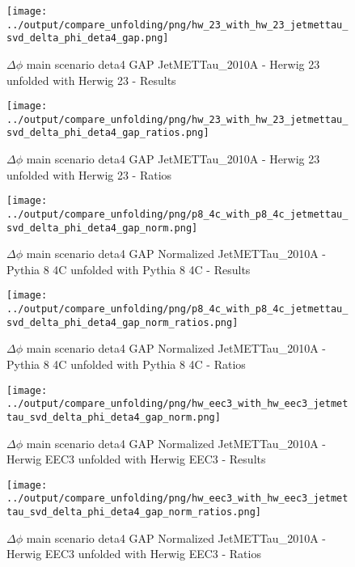 \documentclass[11pt]{book}
\begin{document}
\begin{figure}[ht]
\centering
\texttt{[image: ../output/compare\_unfolding/png/hw\_23\_with\_hw\_23\_jetmettau\_svd\_delta\_phi\_deta4\_gap.png]}
\caption{$\Delta\phi$ main scenario deta4 GAP JetMETTau\_2010A - Herwig 23 unfolded with Herwig 23 - Results}
\label{hw_23_hw_23_jetmettau_svd_delta_phi_deta4_gap_a}
\end{figure}

\begin{figure}[ht]
\centering
\texttt{[image: ../output/compare\_unfolding/png/hw\_23\_with\_hw\_23\_jetmettau\_svd\_delta\_phi\_deta4\_gap\_ratios.png]}
\caption{$\Delta\phi$ main scenario deta4 GAP JetMETTau\_2010A - Herwig 23 unfolded with Herwig 23 - Ratios}
\label{hw_23_hw_23_jetmettau_svd_delta_phi_deta4_gap_b}
\end{figure}



\begin{figure}[ht]
\centering
\texttt{[image: ../output/compare\_unfolding/png/p8\_4c\_with\_p8\_4c\_jetmettau\_svd\_delta\_phi\_deta4\_gap\_norm.png]}
\caption{$\Delta\phi$ main scenario deta4 GAP Normalized JetMETTau\_2010A - Pythia 8 4C unfolded with Pythia 8 4C - Results}
\label{p8_p8_jetmettau_svd_delta_phi_deta4_gap_norm_a}
\end{figure}

\begin{figure}[ht]
\centering
\texttt{[image: ../output/compare\_unfolding/png/p8\_4c\_with\_p8\_4c\_jetmettau\_svd\_delta\_phi\_deta4\_gap\_norm\_ratios.png]}
\caption{$\Delta\phi$ main scenario deta4 GAP Normalized JetMETTau\_2010A - Pythia 8 4C unfolded with Pythia 8 4C - Ratios}
\label{p8_p8_jetmettau_svd_delta_phi_deta4_gap_norm_b}
\end{figure}

\begin{figure}[ht]
\centering
\texttt{[image: ../output/compare\_unfolding/png/hw\_eec3\_with\_hw\_eec3\_jetmettau\_svd\_delta\_phi\_deta4\_gap\_norm.png]}
\caption{$\Delta\phi$ main scenario deta4 GAP Normalized JetMETTau\_2010A - Herwig EEC3 unfolded with Herwig EEC3 - Results}
\label{hw_eec3_hw_eec3_jetmettau_svd_delta_phi_deta4_gap_norm_a}
\end{figure}

\begin{figure}[ht]
\centering
\texttt{[image: ../output/compare\_unfolding/png/hw\_eec3\_with\_hw\_eec3\_jetmettau\_svd\_delta\_phi\_deta4\_gap\_norm\_ratios.png]}
\caption{$\Delta\phi$ main scenario deta4 GAP Normalized JetMETTau\_2010A - Herwig EEC3 unfolded with Herwig EEC3 - Ratios}
\label{hw_eec3_hw_eec3_jetmettau_svd_delta_phi_deta4_gap_norm_b}
\end{figure}
\end{document}
